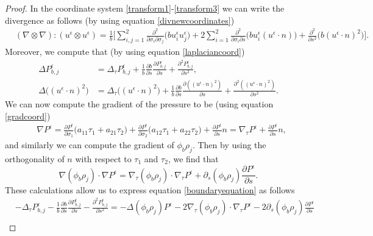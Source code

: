 \documentclass[12pt,a4paper]{article}
\theoremstyle{definition}
\theoremstyle{remark}
\numberwithin{equation}{section}
\begin{document}
\begin{proof}
In the coordinate system \eqref{transform1}-\eqref{transform3} we can write the divergence as follows (by using equation \eqref{divnewcoordinates})
\begingroup
\allowdisplaybreaks
\begin{align} \label{doubledivergence}
&(\nabla \otimes \nabla) : (u^\epsilon \otimes u^\epsilon) = \frac{1}{b} \bigg[ \sum_{i,j=1}^2 \frac{\partial^2}{\partial \sigma_i \partial \sigma_j} \big( b u^\epsilon_i u^\epsilon_j \big) + 2 \sum_{i=1}^2 \frac{\partial^2}{\partial \sigma_i \partial s} \big( b u^\epsilon_i (u^\epsilon \cdot n) \big) + \frac{\partial^2}{\partial s^2} \big( b (u^\epsilon \cdot n)^2 \big) \bigg].
\end{align}
\endgroup
Moreover, we compute that (by using equation \eqref{laplaciancoord})
\begin{align*}
\Delta P^\epsilon_{b,j} &= \Delta_\tau P^\epsilon_{b,j} + \frac{1}{b} \frac{\partial b}{\partial s} \frac{\partial P^\epsilon_{b,j}}{\partial s} + \frac{\partial^2 P^\epsilon_{b,j}}{\partial s^2}, \\
\Delta \big( (u^\epsilon \cdot n)^2 \big) &= \Delta_\tau \big( (u^\epsilon \cdot n)^2 \big) + \frac{1}{b} \frac{\partial b}{\partial s} \frac{\partial ( (u^\epsilon \cdot n)^2)}{\partial s} + \frac{\partial^2 ( (u^\epsilon \cdot n)^2)}{\partial s^2}. 
\end{align*}
We can now compute the gradient of the pressure to be (using equation \eqref{gradcoord})
\begin{align*}
&\nabla P^\epsilon = \frac{\partial P^\epsilon}{\partial \sigma_1} \big( a_{11} \tau_1 + a_{21} \tau_2  \big) + \frac{\partial P^\epsilon}{\partial \sigma_2} \big( a_{12} \tau_1 + a_{22} \tau_2  \big) + \frac{\partial P^\epsilon}{\partial s}  n = \nabla_\tau P^\epsilon + \frac{\partial P^\epsilon}{\partial s}  n,
\end{align*}
and similarly we can compute the gradient of $\phi_b \rho_j$. Then by using the orthogonality of $n$ with respect to $\tau_1$ and $\tau_2$, we find that
\begin{equation*}
\nabla (\phi_b \rho_j) \cdot \nabla P^\epsilon = \nabla_\tau (\phi_b \rho_j) \cdot \nabla_\tau P^\epsilon + \partial_s (\phi_b \rho_j) \frac{\partial P^\epsilon}{\partial s}. 
\end{equation*}
These calculations allow us to express equation \eqref{boundaryequation} as follows
\begin{align*}
&-\Delta_\tau P^\epsilon_{b,j} - \frac{1}{b} \frac{\partial b}{\partial s} \frac{\partial P^\epsilon_{b,j}}{\partial s} - \frac{\partial^2 P^\epsilon_{b,j}}{\partial s^2} = - \Delta (\phi_b \rho_j) P^\epsilon - 2 \nabla_\tau (\phi_b \rho_j) \cdot \nabla_\tau P^\epsilon - 2 \partial_s (\phi_b \rho_j) \frac{\partial P^\epsilon}{\partial s} \\

\end{align*}
\end{proof}
\end{document}
